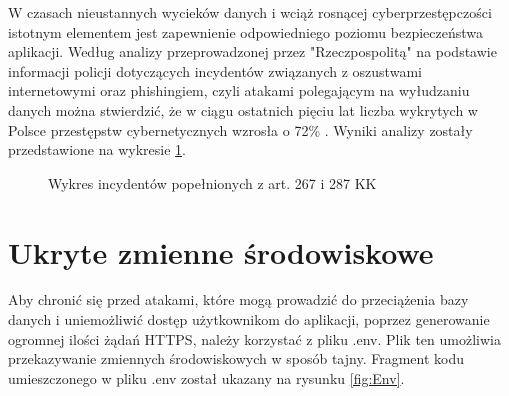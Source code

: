 W czasach nieustannych wycieków danych i wciąż rosnącej cyberprzestępczości istotnym elementem jest zapewnienie odpowiedniego poziomu bezpieczeństwa aplikacji. Według analizy przeprowadzonej przez "Rzeczpospolitą" na podstawie informacji policji dotyczących incydentów związanych z oszustwami internetowymi oraz phishingiem, czyli atakami polegającym na wyłudzaniu danych \cite{phishing} można stwierdzić, że w ciągu ostatnich pięciu lat liczba wykrytych w Polsce przestępstw cybernetycznych wzrosła o 72\% \cite{wykresbezpieczenstwo}. Wyniki analizy zostały przedstawione na wykresie \ref{fig:Wykres}. \\

\begin{figure}[h]
	\centering
	\caption{Wykres incydentów popełnionych z art. 267 i 287 KK}
	\label{fig:Wykres}
\end{figure}

\section*{Ukryte zmienne środowiskowe}

Aby chronić się przed atakami, które mogą prowadzić do przeciążenia bazy danych i uniemożliwić dostęp użytkownikom do aplikacji, poprzez generowanie ogromnej ilości żądań HTTPS, należy korzystać z pliku .env. Plik ten umożliwia przekazywanie zmiennych środowiskowych w sposób tajny. Fragment kodu umieszczonego w pliku .env został ukazany na rysunku \ref{fig:Env}.

